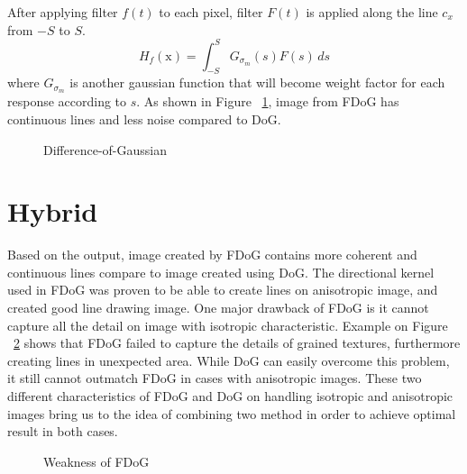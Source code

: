 After applying filter $f(t)$ to each pixel, filter $F(t)$ is applied along the line $c_{x}$ from $-S$ to $S$. 
\begin{equation}
	H_{f}(\mbox{x}) = \int_{-S}^{S} G_{\sigma_{m}}(s)F(s)\,ds
\end{equation}
where $G_{\sigma_{m}}$ is another gaussian function that will become weight factor for each response according to $s$. As shown in Figure ~\ref{fig:FDoG}, image from FDoG has continuous lines and less noise compared to DoG.

\begin{figure}[H]
	\centering
	\caption{Difference-of-Gaussian}\label{fig:FDoG}	
\end{figure}


\section{Hybrid}
Based on the output, image created by FDoG contains more coherent and continuous lines compare to image created using DoG. The directional kernel used in FDoG was proven to be able to create lines on anisotropic image, and created good line drawing image. One major drawback of FDoG is it cannot capture all the detail on image with isotropic characteristic. Example on Figure ~\ref{fig:FDoGWeakness} shows that FDoG failed to capture the details of grained textures, furthermore creating lines in unexpected area. While DoG can easily overcome this problem, it still cannot outmatch FDoG in cases with anisotropic images. These two different characteristics of FDoG and DoG on handling isotropic and anisotropic images bring us to the idea of combining two method in order to achieve optimal result in both cases.

\begin{figure}[H]
	\centering
	\caption{Weakness of FDoG}\label{fig:FDoGWeakness}
\end{figure}

